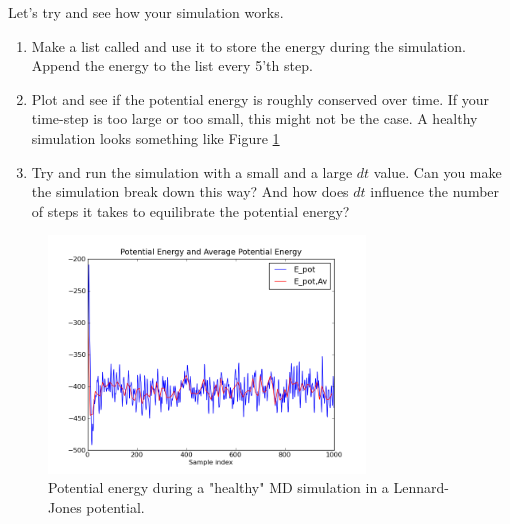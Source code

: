 \documentclass{article}
\begin{document}
Let's try and see how your simulation works.

\begin{enumerate}[resume]

    \item Make a list called  and use it to store the energy during the simulation.
        Append the energy to the list every 5'th step.

    \item Plot  and see if the potential energy is roughly conserved over time.
        If your time-step is too large or too small, this might not be the case.
        A healthy simulation looks something like Figure \ref{fig:potential_energy}

    \item Try and run the simulation with a small and a large $dt$ value. 
        Can you make the simulation break down this way?
        And how does $dt$ influence the number of steps it takes to equilibrate the potential energy?

\end{enumerate}

\begin{figure}[htb]
  \centering
  \includegraphics[width=0.75\textwidth]{potential_energy.png}
  \caption{Potential energy during a "healthy" MD simulation in a Lennard-Jones potential.}
  \label{fig:potential_energy}
\end{figure}
\end{document}
